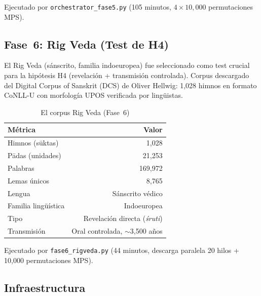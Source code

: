 \documentclass[12pt,a4paper]{article}
\begin{document}
\noindent
Ejecutado por \texttt{orchestrator\_fase5.py} (105 minutos, $4 \times 10{,}000$ permutaciones MPS).

\subsection{Fase~6: Rig Veda (Test de H4)}

El Rig Veda (s\'anscrito, familia indoeuropea) fue seleccionado como test crucial
para la hip\'otesis H4 (revelaci\'on + transmisi\'on controlada). Corpus descargado
del Digital Corpus of Sanskrit (DCS) de Oliver Hellwig: 1,028 himnos en formato
CoNLL-U con morfolog\'ia UPOS verificada por ling\"uistas.

\begin{table}[H]
\centering
\caption{El corpus Rig Veda (Fase~6)}
\begin{tabular}{lr}
\toprule
\textbf{M\'etrica} & \textbf{Valor} \\
\midrule
Himnos (s\=uktas) & 1,028 \\
P\=adas (unidades) & 21,253 \\
Palabras & 169,972 \\
Lemas \'unicos & 8,765 \\
Lengua & S\'anscrito v\'edico \\
Familia ling\"u\'istica & Indoeuropea \\
Tipo & Revelaci\'on directa (\emph{\'{s}ruti}) \\
Transmisi\'on & Oral controlada, $\sim$3,500 a\~nos \\
\bottomrule
\end{tabular}
\end{table}

\noindent
Ejecutado por \texttt{fase6\_rigveda.py} (44 minutos, descarga paralela 20 hilos + 10{,}000 permutaciones MPS).

\subsection{Infraestructura}
\end{document}
